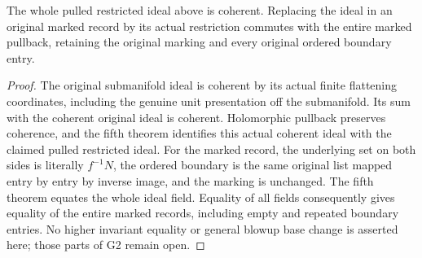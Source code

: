 \begin{theorem}
\label{hir:submersion-relative-restricted-marked-record}
The whole pulled restricted ideal above is coherent. Replacing the ideal in
an original marked record by its actual restriction commutes with the entire
marked pullback, retaining the original marking and every original ordered
boundary entry.
\leanok
\begin{proof}
The original submanifold ideal is coherent by its actual finite flattening
coordinates, including the genuine unit presentation off the submanifold.
Its sum with the coherent original ideal is coherent. Holomorphic pullback
preserves coherence, and the fifth theorem identifies this actual coherent
ideal with the claimed pulled restricted ideal. For the marked record, the
underlying set on both sides is literally $f^{-1}N$, the ordered boundary is
the same original list mapped entry by entry by inverse image, and the
marking is unchanged. The fifth theorem equates the whole ideal field.
Equality of all fields consequently gives equality of the entire marked
records, including empty and repeated boundary entries. No higher invariant
equality or general blowup base change is asserted here; those parts of G2
remain open.
\end{proof}
\end{theorem}
